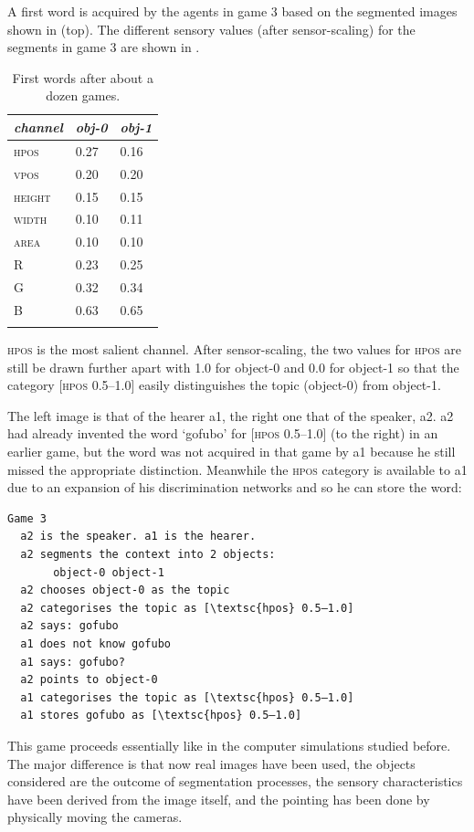A first word is acquired by the agents in game 3 
based on the segmented images shown in  (top).
The different sensory values (after sensor-scaling)
for the segments in game 3 are shown in . 


\begin{table}[b]
\begin{center}
\begin{tabular}{lll}
\lsptoprule
{\itshape channel}& {\itshape obj-0} & {\itshape obj-1}\\ \midrule
\textsc{hpos} & 0.27 & 0.16\\ 
\textsc{vpos} & 0.20 & 0.20\\ 
\textsc{height} & 0.15 & 0.15\\ 
\textsc{width} & 0.10 & 0.11\\ 
\textsc{area} & 0.10 & 0.10\\ 
R & 0.23 & 0.25\\ 
G & 0.32 & 0.34\\ 
B & 0.63 & 0.65\\ 
\lspbottomrule
\end{tabular}
\caption{\label{tab:game3b}First words after about a dozen games.}
\end{center}
\end{table}
\clearpage
\textsc{hpos} is the most salient channel. After sensor-scaling, 
the two values for \textsc{hpos} are still be drawn further
apart with 1.0 for object-0 and 
0.0 for object-1 so that the category [\textsc{hpos} 0.5–1.0] easily 
distinguishes the topic (object-0) from object-1.

The left image is that of the hearer {\bfshape a1}, the right one
that of the speaker, {\bfshape a2}.
{\bfshape a2} had already invented the word `gofubo' for 
[\textsc{hpos} 0.5–1.0] (to the right) in an earlier game, 
but the word was not acquired in that game
by {\bfshape a1} because he still missed the 
appropriate distinction. Meanwhile the \textsc{hpos} category 
is available to {\bfshape a1} due to an
expansion of his discrimination networks
and so he can store the word: 
\begin{verbatim}
Game 3 
  a2 is the speaker. a1 is the hearer. 
  a2 segments the context into 2 objects: 
       object-0 object-1
  a2 chooses object-0 as the topic 
  a2 categorises the topic as [\textsc{hpos} 0.5–1.0]
  a2 says: gofubo
  a1 does not know gofubo
  a1 says: gofubo?
  a2 points to object-0
  a1 categorises the topic as [\textsc{hpos} 0.5–1.0]
  a1 stores gofubo as [\textsc{hpos} 0.5–1.0]
\end{verbatim}
This game proceeds essentially like in the computer
simulations studied before. The major difference is
that now real images have been used, the objects
considered are the outcome of segmentation processes,
the sensory characteristics have been derived from the 
image itself, and the pointing has been done by 
physically moving the cameras. 

